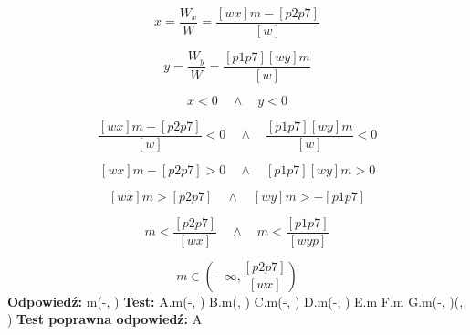 \documentclass[12pt, a4paper]{article}
\theoremstyle{definition} %
\theoremstyle{definition} %
\newcommand{\rozwStop}{\newline}                                            %
\newcommand{\odpStart}{\noindent \textbf{Odpowiedź:}\newline}    %
\newcommand{\odpStop}{\newline}                                             %
\newcommand{\testStart}{\noindent \textbf{Test:}\newline} %
\newcommand{\testStop}{\newline} %
\newcommand{\kluczStart}{\noindent \textbf{Test poprawna odpowiedź:}\newline} %
\newcommand{\kluczStop}{\newline} %
\begin{document}
$$x=\frac{W_{x}}{W}=\frac{[wx]m-[p2p7]}{[w]}$$

$$y=\frac{W_{y}}{W}=\frac{[p1p7][wy]m}{[w]}$$

$$x<0 \quad \land \quad y<0$$

$$\frac{[wx]m-[p2p7]}{[w]}<0 \quad \land \quad  \frac{[p1p7][wy]m}{[w]}<0$$

$$[wx]m-[p2p7]>0 \quad \land \quad  [p1p7][wy]m>0$$

$$[wx]m>[p2p7] \quad \land \quad [wy]m>-[p1p7]$$

$$m<\frac{[p2p7]}{[wx]} \quad \land \quad m<\frac{[p1p7]}{[wyp]}$$

$$m\in\left(-\infty, \frac{[p2p7]}{[wx]}\right) $$
\rozwStop
\odpStart
m\in\left(-\infty, \frac{[p2p7]}{[wx]}\right)\odpStop
\testStart
A.m\in\left(-\infty, \frac{[p2p7]}{[wx]}\right)
B.m\in\left(\frac{[p2p7]}{[wx]}, \infty\right)
C.m\in\left(-\infty, \frac{[p1p7]}{[wyp]}\right)
D.m\in\left(-\infty, \frac{[p2p7]}{[w]}\right)
E.m\in\emptyset
F.m\in{}
G.m\in\left(-\infty, \frac{[p2p7]}{[wx]}\right)\cup \left(\frac{[p1p7]}{[wyp]}, \infty\right)
\testStop
\kluczStart
A
\kluczStop
\end{document}
